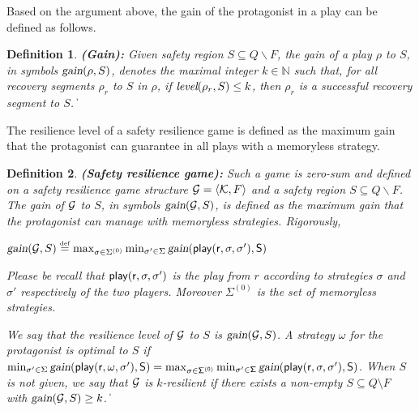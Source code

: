 \documentclass[times,10pt,twocolumn]{article}
\newtheorem{definition}{Definition}
\newcommand\qed{\hfill\ensuremath{\Box}}
\newcommand{\emgain}{\textsl{gain}}
\newcommand{\emplay}{\ensuremath{\sf play}}
\newcommand{\nnneg}{{\mathbb N}}
\newcommand{\defn}{\stackrel{\mbox{\tiny def}}{=}}
\newcommand{\calg}{{\cal G}}
\newcommand{\calk}{{\cal K}}
\def\qed{\ifmmode\|\else{\unskip\nobreak\hfil
\penalty50\hskip1em\null\nobreak\hfil$\blacksquare$
\parfillskip=0pt\finalhyphendemerits=0\endgraf}\fi}
\begin{document}
Based on the argument above, 
the gain of the protagonist in a play can be defined as follows. 

\begin{definition}
\label{def.gain} {\bf (Gain):} 
Given safety region $S \subseteq Q\smallsetminus F$, 
the gain of a play $\rho$ to $S$, in symbols $\emgain(\rho,S)$, 
denotes the maximal integer $k \in \mathbb N$ such that, 
for all recovery segments $\rho_r$ to $S$ in $\rho$, 
if $\mbox{\em level}(\rho_r,S)\leq k$, 
then $\rho_r$ is a successful recovery segment to $S$. 
\qed 
\end{definition}

The resilience level of a safety resilience game is defined 
as the maximum gain that the protagonist can guarantee in all plays 
with a memoryless strategy.  


%  

\begin{definition}\label{def.srgame}  
{\bf (Safety resilience game):} 
Such a game is zero-sum and defined on 
a safety resilience game structure $\calg=\langle \calk,F\rangle$ 
and a safety region $S\subseteq Q\smallsetminus F$. 
The gain of $\calg$ to $S$, in symbols $\emgain(\calg,S)$, is defined as 
the maximum gain that the protagonist can manage with memoryless strategies.  
Rigorously, 
\begin{center} 
$\emgain(\calg,S)\defn \max_{\sigma\in \Sigma^{(0)}}\min_{\sigma'\in \Sigma}
\emgain(\emplay(r,\sigma,\sigma'),S)$
\end{center} 
\label{reply1.emplay} 
Please be recall that $\emplay(r,\sigma,\sigma')$ is the play from $r$ 
according to strategies $\sigma$ and $\sigma'$ respectively of the 
two players. 
Moreover $\Sigma^{(0)}$ is the set of memoryless strategies. 

We say that the resilience level of $\calg$ to $S$ is $\emgain(\calg,S)$. 
\label{reply2.optimal}
A strategy $\omega$ for the protagonist is optimal to $S$ if 
$\min_{\sigma'\in \Sigma}
\emgain(\emplay(r,\omega,\sigma'),S)=\max_{\sigma\in \Sigma^{(0)}}\min_{\sigma'\in \Sigma}
\emgain(\emplay(r,\sigma,\sigma'),S)$.  
When $S$ is not given, 
we say that $\calg$ is {\em $k$-resilient} if there exists a non-empty $S \subseteq Q \setminus F$ with $\emgain(\calg,S)\geq k$.
\qed 
\end{definition} 
\end{document}
